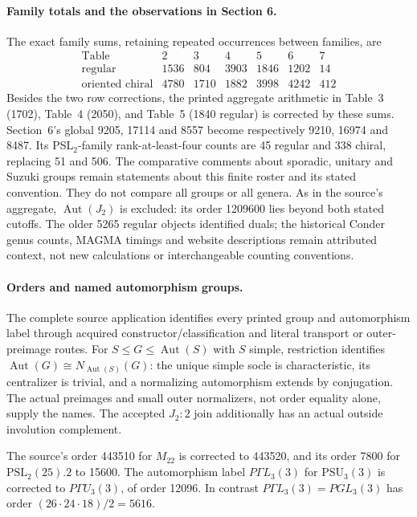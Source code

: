 \documentclass[11pt,a4paper]{article}
\begin{document}
\paragraph{Family totals and the observations in Section 6.}
The exact family sums, retaining repeated occurrences between families, are
\[
\begin{array}{c|rrrrrr}
\text{Table}&2&3&4&5&6&7\\\hline
\text{regular}&1536&804&3903&1846&1202&14\\
\text{oriented chiral}&4780&1710&1882&3998&4242&412
\end{array}
\]
Besides the two row corrections, the printed aggregate arithmetic in
Table~3 (1702), Table~4 (2050), and Table~5 (1840 regular) is corrected by
these sums. Section~6's global 9205, 17114 and 8557 become respectively
9210, 16974 and 8487. Its PSL$_2$-family rank-at-least-four counts are
45 regular and 338 chiral, replacing 51 and 506. The comparative comments
about sporadic, unitary and Suzuki groups remain statements about this
finite roster and its stated convention. They do not compare all groups
or all genera. As in the source's aggregate, $\operatorname{Aut}(J_2)$ is
excluded: its order 1209600 lies beyond both stated cutoffs. The older
5265 regular objects identified duals; the historical
Conder genus counts, MAGMA timings and website descriptions remain attributed
context, not new calculations or interchangeable counting conventions.

\paragraph{Orders and named automorphism groups.}
The complete source application identifies every printed group and automorphism
label through acquired constructor/classification and literal transport or
outer-preimage routes. For $S\le G\le\operatorname{Aut}(S)$ with $S$ simple,
restriction identifies
$\operatorname{Aut}(G)\cong N_{\operatorname{Aut}(S)}(G)$: the unique simple
socle is characteristic, its centralizer is trivial, and a normalizing
automorphism extends by conjugation. The actual preimages and small outer
normalizers, not order equality alone, supply the names. The accepted $J_2:2$
join additionally has an actual outside involution complement.

The source's order 443510 for $M_{22}$ is corrected to 443520, and its order
7800 for $\mathrm{PSL}_2(25).2$ to 15600. The automorphism label
$P\Gamma L_3(3)$ for $\mathrm{PSU}_3(3)$ is corrected to $P\Gamma U_3(3)$,
of order 12096. In contrast $P\Gamma L_3(3)=PGL_3(3)$ has order
$(26\cdot24\cdot18)/2=5616$.
\end{document}
